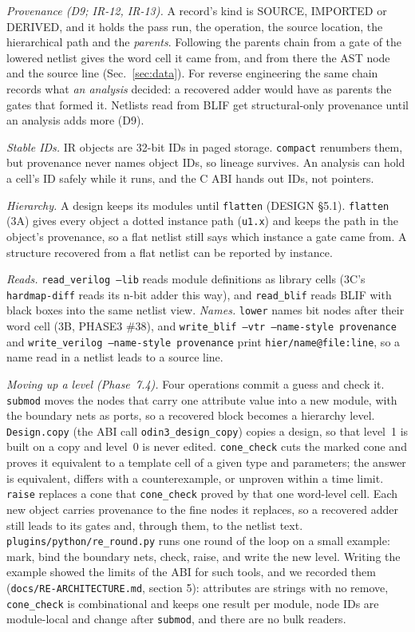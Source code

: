 \documentclass[conference]{IEEEtran}
\newcommand{\code}[1]{\texttt{#1}}
\begin{document}
\emph{Provenance (D9; IR-12, IR-13).} A record's kind is SOURCE, IMPORTED or DERIVED, and it
holds the pass run, the operation, the source location, the hierarchical path and the
\emph{parents}. Following the parents chain from a gate of the lowered netlist gives the word
cell it came from, and from there the AST node and the source line (Sec.~\ref{sec:data}). For
reverse engineering the same chain records what \emph{an analysis} decided: a recovered adder
would have as parents the gates that formed it. Netlists read from BLIF get structural-only
provenance until an analysis adds more (D9).

\emph{Stable IDs.} IR objects are 32-bit IDs in paged storage. \code{compact} renumbers them, but
provenance never names object IDs, so lineage survives. An analysis can hold a cell's ID safely
while it runs, and the C ABI hands out IDs, not pointers.

\emph{Hierarchy.} A design keeps its modules until \code{flatten} (DESIGN \S5.1).
\code{flatten} (3A) gives every object a dotted instance path (\code{u1.x}) and keeps the path in
the object's provenance, so a flat netlist still says which instance a gate came from. A
structure recovered from a flat netlist can be reported by instance.

\emph{Reads.} \code{read\_verilog --lib} reads module definitions as library cells (3C's
\code{hardmap-diff} reads its n-bit adder this way), and \code{read\_blif} reads BLIF with black
boxes into the same netlist view. \emph{Names.} \code{lower} names bit nodes after their word
cell (3B, PHASE3 \#38), and \code{write\_blif --vtr --name-style provenance} and
\code{write\_verilog --name-style provenance} print \code{hier/name@file:line}, so a name read in
a netlist leads to a source line.

\emph{Moving up a level (Phase~7.4).} Four operations commit a guess and check it. \code{submod}
moves the nodes that carry one attribute value into a new module, with the boundary nets as
ports, so a recovered block becomes a hierarchy level. \code{Design.copy} (the ABI call
\code{odin3\_design\_copy}) copies a design, so that level~1 is built on a copy and level~0 is
never edited. \code{cone\_check} cuts the marked cone and proves it equivalent to a template cell
of a given type and parameters; the answer is equivalent, differs with a counterexample, or
unproven within a time limit. \code{raise} replaces a cone that \code{cone\_check} proved by that
one word-level cell. Each new object carries provenance to the fine nodes it replaces, so a
recovered adder still leads to its gates and, through them, to the netlist text.
\code{plugins/python/re\_round.py} runs one round of the loop on a small example: mark, bind the
boundary nets, check, raise, and write the new level. Writing the example showed the limits of
the ABI for such tools, and we recorded them (\code{docs/RE-ARCHITECTURE.md}, section 5):
attributes are strings with no remove, \code{cone\_check} is combinational and keeps one result
per module, node IDs are module-local and change after \code{submod}, and there are no bulk
readers.
\end{document}
